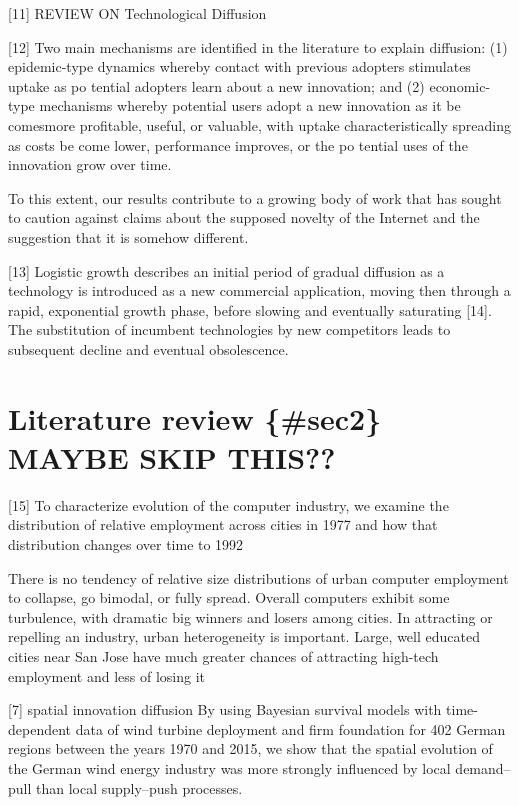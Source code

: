 \documentclass[10pt,letterpaper]{article}
\begin{document}
{[}11{]} REVIEW ON Technological Diffusion

{[}12{]} Two main mechanisms are identified in the literature to explain
diffusion: (1) epidemic-type dynamics whereby contact with previous
adopters stimulates uptake as po tential adopters learn about a new
innovation; and (2) economic-type mechanisms whereby potential users
adopt a new innovation as it be comesmore profitable, useful, or
valuable, with uptake characteristically spreading as costs be come
lower, performance improves, or the po tential uses of the innovation
grow over time.

To this extent, our results contribute to a growing body of work that
has sought to caution against claims about the supposed novelty of the
Internet and the suggestion that it is somehow different.

{[}13{]} Logistic growth describes an initial period of gradual
diffusion as a technology is introduced as a new commercial application,
moving then through a rapid, exponential growth phase, before slowing
and eventually saturating {[}14{]}. The substitution of incumbent
technologies by new competitors leads to subsequent decline and eventual
obsolescence.

\hypertarget{literature-review-sec2-maybe-skip-this}{%
\section{Literature review \{\#sec2\} MAYBE SKIP
THIS??}\label{literature-review-sec2-maybe-skip-this}}

{[}15{]} To characterize evolution of the computer industry, we examine
the distribution of relative employment across cities in 1977 and how
that distribution changes over time to 1992

There is no tendency of relative size distributions of urban computer
employment to collapse, go bimodal, or fully spread. Overall computers
exhibit some turbulence, with dramatic big winners and losers among
cities. In attracting or repelling an industry, urban heterogeneity is
important. Large, well educated cities near San Jose have much greater
chances of attracting high-tech employment and less of losing it

{[}7{]} spatial innovation diffusion By using Bayesian survival models
with time-dependent data of wind turbine deployment and firm foundation
for 402 German regions between the years 1970 and 2015, we show that the
spatial evolution of the German wind energy industry was more strongly
influenced by local demand-- pull than local supply--push processes.
\end{document}
